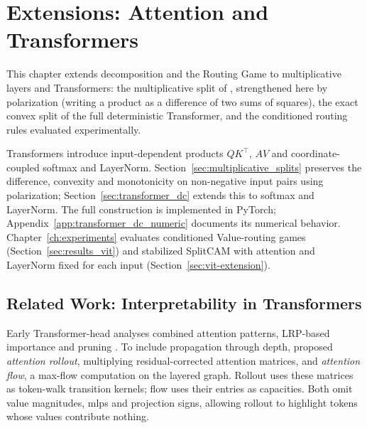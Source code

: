 \chapter{Extensions: Attention and Transformers}\label{ch:transformers}

This chapter extends decomposition and the Routing Game to multiplicative layers and Transformers: the multiplicative split of \textcite{hiddenMono}, strengthened here by polarization (writing a product as a difference of two sums of squares), the exact convex split of the full deterministic Transformer, and the conditioned routing rules evaluated experimentally.

Transformers \parencite{Vaswani2017} introduce input-dependent products $QK^\top$, $AV$ and coordinate-coupled softmax and LayerNorm. Section~\ref{sec:multiplicative_splits} preserves the difference, convexity and monotonicity on non-negative input pairs using polarization; Section~\ref{sec:transformer_dc} extends this to softmax and LayerNorm. The full construction is implemented in PyTorch; Appendix~\ref{app:transformer_dc_numeric} documents its numerical behavior. Chapter~\ref{ch:experiments} evaluates conditioned Value-routing games (Section~\ref{sec:results_vit}) and stabilized SplitCAM with attention and LayerNorm fixed for each input (Section~\ref{sec:vit-extension}).

\section{Related Work: Interpretability in Transformers}\label{sec:related_work_transformers}

Early Transformer-head analyses combined attention patterns, LRP-based importance and pruning \parencite{Voita2019}. To include propagation through depth, \textcite{Abnar2020attention} proposed \emph{attention rollout}, multiplying residual-corrected attention matrices, and \emph{attention flow}, a max-flow computation on the layered graph. Rollout uses these matrices as token-walk transition kernels; flow uses their entries as capacities. Both omit value magnitudes, \acp{mlp} and projection signs, allowing rollout to highlight tokens whose values contribute nothing.


